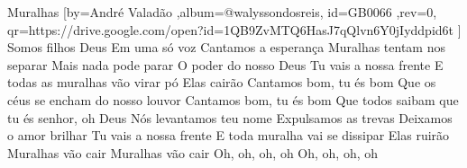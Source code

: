 \beginsong
{Muralhas %
}[by={André Valadão %
},album={@walyssondosreis},
id={GB0066 %
},rev={0}, %
qr={https://drive.google.com/open?id=1QB9ZvMTQ6HasJ7qQlvn6Y0jIyddpid6t %
}]
\beginverse*
Somos filhos Deus
Em uma só voz
Cantamos a esperança
Muralhas tentam nos separar
Mais nada pode parar
O poder do nosso Deus
Tu vais a nossa frente
E todas as muralhas vão virar pó
Elas cairão
\endverse
\beginchorus
Cantamos bom, tu és bom
Que os céus se encham do nosso louvor
Cantamos bom, tu és bom
Que todos saibam que tu és senhor, oh Deus
\endchorus
\beginverse*
Nós levantamos teu nome
Expulsamos as trevas
Deixamos o amor brilhar
Tu vais a nossa frente
E toda muralha vai se dissipar
Elas ruirão
\endverse
\beginverse*
Muralhas vão cair
Muralhas vão cair
Oh, oh, oh, oh
Oh, oh, oh, oh
\endverse
\vspace{4em} %
\begin{comment}
\lstset{basicstyle=\scriptsize\bf} %
\tab{Solo 1}
\begin{lstlisting}
E|-----------------------------------------------------|
B|-----------------------------------------------------|
G|-----------------------------------------------------|
D|-----------------------------------------------------|
A|-----------------------------------------------------|
E|-----------------------------------------------------|
\end{lstlisting}
\end{comment}
 
